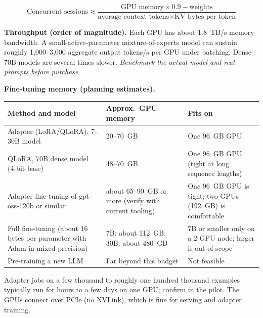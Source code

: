 \[
  \text{Concurrent sessions} \approx \frac{\text{GPU memory} \times 0.9 - \text{weights}}{\text{average context tokens} \times \text{KV bytes per token}}
\]

\textbf{Throughput (order of magnitude).} Each GPU has about 1.8~TB/s memory
bandwidth. A small-active-parameter mixture-of-experts model can sustain roughly
1,000--3,000 aggregate output tokens/s per GPU under batching. Dense 70B models
are several times slower. \emph{Benchmark the actual model and real prompts
before purchase.}

\textbf{Fine-tuning memory (planning estimates).}

{\small
\begin{xltabular}{\textwidth}{@{}Y{1.138}Y{0.828}Y{1.034}@{}}
  \toprule
  Method and model & Approx.\ GPU memory & Fits on \\
  \midrule
  \endhead
  Adapter (LoRA/QLoRA), 7--30B model & 20--70~GB & One 96~GB GPU \\
  QLoRA, 70B dense model (4-bit base) & 48--70~GB & One 96~GB GPU (tight at long sequence lengths) \\
  Adapter fine-tuning of gpt-oss-120b or similar & about 65--90~GB or more (verify with current tooling) & One 96~GB GPU is tight; two GPUs (192~GB) is comfortable \\
  Full fine-tuning (about 16 bytes per parameter with Adam in mixed precision) & 7B: about 112~GB; 30B: about 480~GB & 7B or smaller only on a 2-GPU node; larger is out of scope \\
  Pre-training a new LLM & Far beyond this budget & Not feasible \\
  \bottomrule
\end{xltabular}}

Adapter jobs on a few thousand to roughly one hundred thousand examples typically
run for hours to a few days on one GPU; confirm in the pilot. The GPUs connect
over PCIe (no NVLink), which is fine for serving and adapter training.


